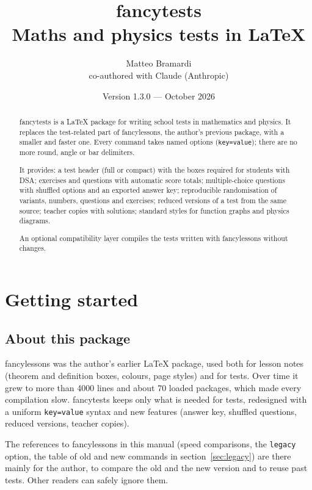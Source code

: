 \documentclass[10pt]{article}
\title{\Huge\bfseries fancytests\\[.3em]
  \Large\mdseries Maths and physics tests in \LaTeX}
\author{Matteo Bramardi\\[.2em]
  \normalsize co-authored with Claude (Anthropic)}
\date{Version 1.3.0 --- October 2026}
\newcommand*{\opt}[1]{\texttt{#1}}
\begin{document}
\pagestyle{plain}
\maketitle
\thispagestyle{empty}

\begin{abstract}
\noindent
\textsf{fancytests} is a \LaTeX{} package for writing school tests in
mathematics and physics. It replaces the test-related part of
\textsf{fancylessons}, the author's previous package, with a smaller and
faster one. Every command takes
named options (\texttt{key=value}); there are no more round, angle or bar
delimiters.

It provides: a test header (full or compact) with the boxes required for
students with DSA; exercises and questions with automatic score totals;
multiple-choice questions with shuffled options and an exported answer key;
reproducible randomisation of variants, numbers, questions and exercises;
reduced versions of a test from the same source; teacher copies with
solutions; standard styles for function graphs and physics diagrams.

An optional compatibility layer compiles the tests written with
\textsf{fancylessons} without changes.
\end{abstract}

\tableofcontents
\newpage

\section{Getting started}

\subsection{About this package}

\textsf{fancylessons} was the author's earlier \LaTeX{} package, used both
for lesson notes (theorem and definition boxes, colours, page styles) and for
tests. Over time it grew to more than 4000 lines and about 70 loaded packages,
which made every compilation slow. \textsf{fancytests} keeps only what is
needed for tests, redesigned with a uniform \texttt{key=value} syntax and
new features (answer key, shuffled questions, reduced versions, teacher
copies).

The references to \textsf{fancylessons} in this manual (speed comparisons,
the \opt{legacy} option, the table of old and new commands in
section~\ref{sec:legacy}) are there mainly for the author, to compare the old
and the new version and to reuse past tests. Other readers can safely ignore
them.
\end{document}
